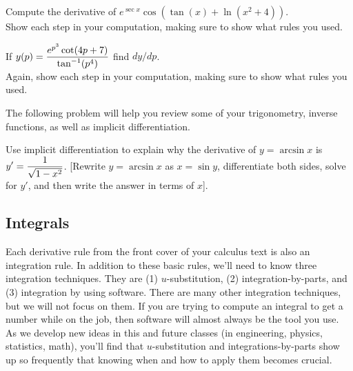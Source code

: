 \begin{problem}
Compute the derivative of $e^{\sec x}\cos(\tan(x)+\ln(x^2+4))$. \\
Show each step in your computation, making sure to show what rules you used. 
\end{problem}

\begin{problem}
If $y(p) = \displaystyle \frac{e^{p^3}\cot(4p+7)}{\tan^{-1}(p^4)}$ find $dy/dp$. \\
Again, show each step in your computation, making sure to show what rules you used.
\end{problem}

The following problem will help you review some of your trigonometry, inverse functions, as well as implicit differentiation.

\begin{problem}
Use implicit differentiation to explain why the derivative of $y=\arcsin x$ is $\displaystyle y'=\frac{1}{\sqrt{1-x^2}}$.  [Rewrite $y=\arcsin x$ as $x=\sin y$, differentiate both sides, solve for $y'$, and then write the answer in terms of $x$].  
\end{problem}


\subsection{Integrals}
Each derivative rule from the front cover of your calculus text is also an integration rule. In addition to these basic rules, we'll need to know three integration techniques.  They are 
(1) {$u$}-substitution,
(2) integration-by-parts, and
(3) integration by using software. 
There are many other integration techniques, but we will not focus on them. If you are trying to compute an integral to get a number while on the job, then software will almost always be the tool you use.  As we develop new ideas in this and future classes (in engineering, physics, statistics, math), you'll find that $u$-substitution and integrations-by-parts show up so frequently that knowing when and how to apply them becomes crucial.

